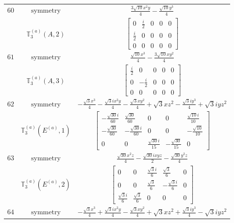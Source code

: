 \documentclass[fleqn,8pt,landscape]{jsarticle}
\begin{document}
\begin{longtable}{ccc}
$ 60 $ & $ \text{symmetry} $ & $ \frac{3 \sqrt{10} x^{2} y}{4} - \frac{\sqrt{10} y^{3}}{4} $ \\
$  $ & $ \mathbb{T}_{3}^{(a)}(A,2) $ & $ \begin{bmatrix} 0 & \frac{i}{2} & 0 & 0 & 0 \\ \frac{i}{2} & 0 & 0 & 0 & 0 \\ 0 & 0 & 0 & 0 & 0 \end{bmatrix} $ \\ \hline
$ 61 $ & $ \text{symmetry} $ & $ \frac{\sqrt{10} x^{3}}{4} - \frac{3 \sqrt{10} x y^{2}}{4} $ \\
$  $ & $ \mathbb{T}_{3}^{(a)}(A,3) $ & $ \begin{bmatrix} \frac{i}{2} & 0 & 0 & 0 & 0 \\ 0 & - \frac{i}{2} & 0 & 0 & 0 \\ 0 & 0 & 0 & 0 & 0 \end{bmatrix} $ \\ \hline
$ 62 $ & $ \text{symmetry} $ & $ - \frac{\sqrt{3} x^{3}}{4} - \frac{\sqrt{3} i x^{2} y}{4} - \frac{\sqrt{3} x y^{2}}{4} + \sqrt{3} x z^{2} - \frac{\sqrt{3} i y^{3}}{4} + \sqrt{3} i y z^{2} $ \\
$  $ & $ \mathbb{T}_{3}^{(a)}(E^{(a)},1) $ & $ \begin{bmatrix} - \frac{\sqrt{30} i}{60} & \frac{\sqrt{30}}{60} & 0 & 0 & \frac{\sqrt{10} i}{10} \\ - \frac{\sqrt{30}}{60} & - \frac{\sqrt{30} i}{60} & 0 & 0 & - \frac{\sqrt{10}}{10} \\ 0 & 0 & \frac{\sqrt{30} i}{15} & - \frac{\sqrt{30}}{15} & 0 \end{bmatrix} $ \\ \hline
$ 63 $ & $ \text{symmetry} $ & $ \frac{\sqrt{30} x^{2} z}{4} - \frac{\sqrt{30} i x y z}{2} - \frac{\sqrt{30} y^{2} z}{4} $ \\
$  $ & $ \mathbb{T}_{3}^{(a)}(E^{(a)},2) $ & $ \begin{bmatrix} 0 & 0 & \frac{\sqrt{3} i}{6} & \frac{\sqrt{3}}{6} & 0 \\ 0 & 0 & \frac{\sqrt{3}}{6} & - \frac{\sqrt{3} i}{6} & 0 \\ \frac{\sqrt{3} i}{6} & \frac{\sqrt{3}}{6} & 0 & 0 & 0 \end{bmatrix} $ \\ \hline
$ 64 $ & $ \text{symmetry} $ & $ - \frac{\sqrt{3} x^{3}}{4} + \frac{\sqrt{3} i x^{2} y}{4} - \frac{\sqrt{3} x y^{2}}{4} + \sqrt{3} x z^{2} + \frac{\sqrt{3} i y^{3}}{4} - \sqrt{3} i y z^{2} $ \\

\end{longtable}
\end{document}
